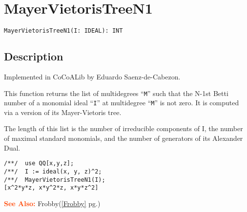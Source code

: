 \documentclass[a4paper]{mybook}
\newenvironment{command}{}{} %
\newcommand\SeeAlso{\par\textcolor{OrangeRed}{\textbf{\large See Also: }}}
\begin{document}
\section{MayerVietorisTreeN1}
\label{MayerVietorisTreeN1}
\begin{command} %


\begin{Verbatim}[label=syntax, rulecolor=\color{MidnightBlue},
frame=single]
MayerVietorisTreeN1(I: IDEAL): INT
\end{Verbatim}


\subsection*{Description}

Implemented in CoCoALib by Eduardo Saenz-de-Cabezon.
\par 
This function returns the list of multidegrees ``\verb&M&'' such that the N-1st
Betti number of a monomial ideal ``\verb&I&'' at multidegree ``\verb&M&'' is not zero.
It is computed via a version of its Mayer-Vietoris tree.
\par 
The length of this list is the number of irreducible components of I,
the number of maximal standard monomials, and the number of generators
of its Alexander Dual.
\begin{Verbatim}[label=example, rulecolor=\color{PineGreen}, frame=single]
/**/  use QQ[x,y,z];
/**/  I := ideal(x, y, z)^2;
/**/  MayerVietorisTreeN1(I);
[x^2*y*z, x*y^2*z, x*y*z^2]
\end{Verbatim}


\SeeAlso %
  Frobby(\ref{Frobby} pg.\pageref{Frobby})
\end{command} %
\end{document}
